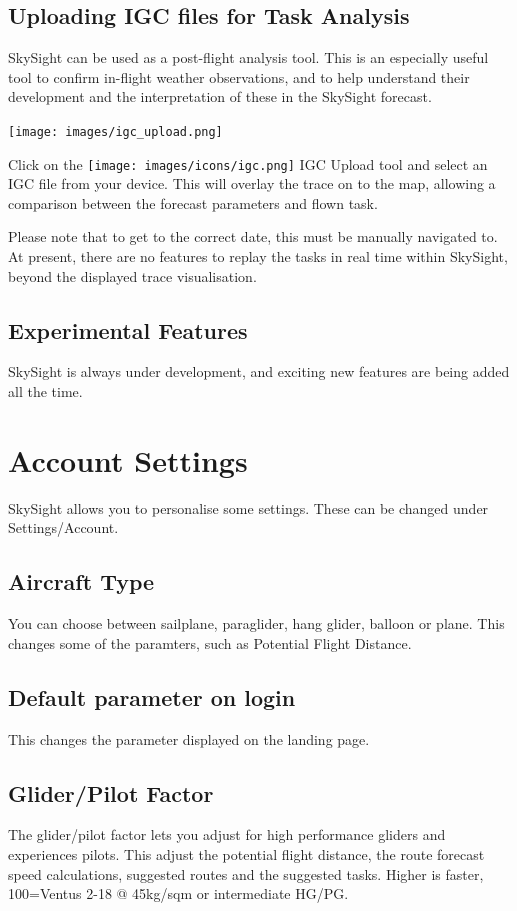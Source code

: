 \documentclass[11pt,a4paper]{article}
\begin{document}
\subsection{Uploading IGC files for Task Analysis}
SkySight can be used as a post-flight analysis tool. This is an especially useful tool to confirm in-flight weather observations, and to help understand their development and the interpretation of these in the SkySight forecast.

\begin{center}
\texttt{[image: images/igc\_upload.png]}
\end{center}

Click on the \texttt{[image: images/icons/igc.png]} IGC Upload tool and select an IGC file from your device. This will overlay the trace on to the map, allowing a comparison between the forecast parameters and flown task.

Please note that to get to the correct date, this must be manually navigated to. At present, there are no features to replay the tasks in real time within SkySight, beyond the displayed trace visualisation.

\subsection{Experimental Features}
SkySight is always under development, and exciting new features are being added all the time.

\section{Account Settings}
SkySight allows you to personalise some settings. These can be changed under Settings/Account.
\subsection{Aircraft Type}
You can choose between sailplane, paraglider, hang glider, balloon or plane. This changes some of the paramters, such as Potential Flight Distance.

\subsection{Default parameter on login}
This changes the parameter displayed on the landing page.

\subsection{Glider/Pilot Factor}\label{subsec:factor}
The glider/pilot factor lets you adjust for high performance gliders and experiences pilots. This adjust the potential flight distance, the route forecast speed calculations, suggested routes and the suggested tasks. Higher is faster, 100=Ventus 2-18 @ 45kg/sqm or intermediate HG/PG.
\end{document}
